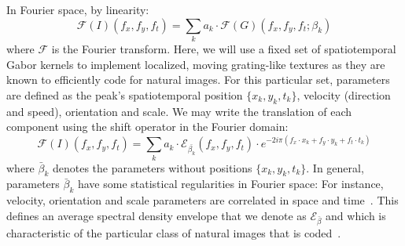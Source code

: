 \documentclass[a4paper,11pt]{article}%
\begin{document}
In Fourier space, by linearity: 
\begin{equation}
\mathcal{F}(I)(f_x, f_y, f_t) = \sum_k a_k \cdot \mathcal{F}(G)(f_x, f_y, f_t; \beta_k) \label{eq:gen2}%
\end{equation} 
where $\mathcal{F}$ is the Fourier transform. %
Here, we will use a fixed set of spatiotemporal Gabor kernels to implement localized, moving grating-like textures as they are known to efficiently code for natural images. For this particular set, parameters are defined as the peak's spatiotemporal position $\{x_k, y_k, t_k\}$, velocity (direction and speed), orientation and scale. We may write the translation of each component using the shift operator in the Fourier domain: 
\begin{equation}
\mathcal{F}(I)(f_x, f_y, f_t) = \sum_k a_k \cdot \mathcal{E}_{\bar{\beta_k}}(f_x, f_y, f_t) \cdot e^{-2i\pi (f_x \cdot x_k + f_y \cdot y_k + f_t \cdot t_k)} \label{eq:gen2bis}
\end{equation} 
where $\bar{\beta}_k$ denotes the parameters without positions $\{x_k, y_k, t_k\}$. In general, parameters $\bar{\beta}_k$ have some statistical regularities in Fourier space: For instance, velocity, orientation and scale parameters are correlated in space and time~\citep{Lewis84,Lagae09}. This defines an average spectral density envelope that we denote as $\mathcal{E}_{\bar{\beta}}$ and which is characteristic of the particular class of natural images that is coded~\citep{Torralba03}. %
\end{document}
